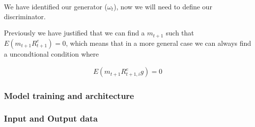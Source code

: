 \documentclass[11pt, oneside]{article}   	%
\begin{document}
We have identified our generator ($\omega_t$), now we will need to define our discriminator.

Previously we have justified that we can find a $m_{t+1}$ such that $E(m_{t+1}R^e_{t+1})=0$, 
which means that in a more general case we can always find a uncondtional condition where 

\begin{align*}
    E(m_{t+1}R^e_{t+1, i}g)=0
\end{align*}

\subsubsection{Model training and architecture}

\subsubsection{Input and Output data}
\end{document}
